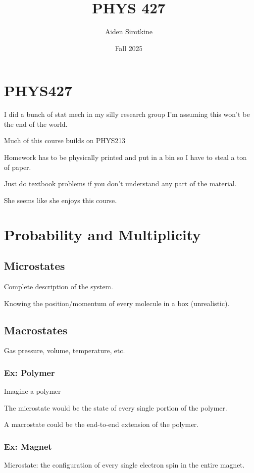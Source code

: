 \documentclass[fleqn]{report}
\date{Fall 2025}
\title{PHYS 427}
\author{Aiden Sirotkine}
\begin{document}
\setlength{\headsep}{10pt}
\setlength{\topmargin}{-2cm}


\pagestyle{fancy}
\maketitle
\tableofcontents
\clearpage

\chapter{PHYS427}
I did a bunch of stat mech in my silly research group I'm assuming this won't 
be the end of the world. \

Much of this course builds on PHYS213

Homework has to be physically printed and put in a bin so I have to steal 
a ton of paper. 

Just do textbook problems if you don't understand any part of the material.

She seems like she enjoys this course. 

\chapter{Probability and Multiplicity}

\section{Microstates}
Complete description of the system. 

Knowing the position/momentum of every molecule in a box (unrealistic).

\section{Macrostates}
Gas pressure, volume, temperature, etc.

\subsection{Ex: Polymer}
Imagine a polymer 

The microstate would be the state of every single portion of the polymer. 

A macrostate could be the end-to-end extension of the polymer. 

\subsection{Ex: Magnet}
Microstate: 
the configuration of every single electron spin in the entire magnet. 
\end{document}
